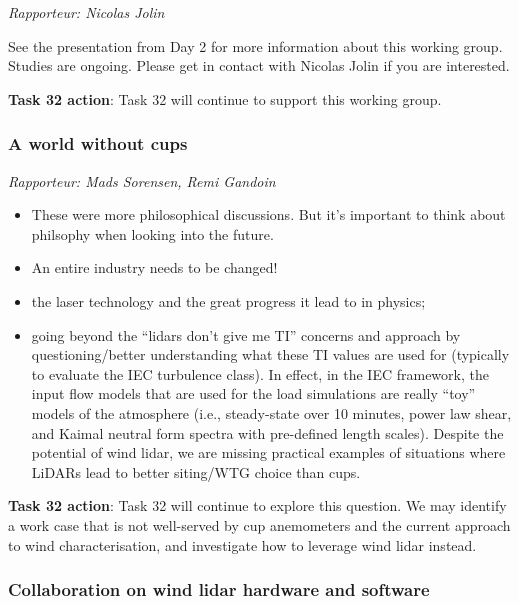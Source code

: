 \emph{Rapporteur: Nicolas Jolin}

See the presentation from Day 2 for more information about this working group. Studies are ongoing. Please get in contact with Nicolas Jolin if you are interested.

\begin{taskactions}
\textbf{Task 32 action}: Task 32 will continue to support this working group.
\end{taskactions}

\subsubsection{A world without cups}

\emph{Rapporteur: Mads Sorensen, Remi Gandoin}

\begin{itemize}
\item These were more philosophical discussions. But it's important to think about philsophy when looking into the future.
\item An entire industry needs to be changed!
\item the laser technology and the great progress it lead to in physics;
\item going beyond the \enquote{lidars don't give me TI} concerns and approach by questioning/better understanding what these TI values are used for (typically to evaluate the IEC turbulence class). In effect, in the IEC framework, the input flow models that are used for the load simulations are really \enquote{toy} models of the atmosphere (i.e., steady-state over 10 minutes, power law shear, and Kaimal neutral form spectra with pre-defined length scales). Despite the potential of wind lidar, we are missing practical examples of situations where LiDARs lead to better siting/WTG choice than cups.
\end{itemize}

\begin{taskactions}
\textbf{Task 32 action}: Task 32 will continue to explore this question. We may identify a work case that is not well-served by cup anemometers and the current approach to wind characterisation, and investigate how to leverage wind lidar instead.
\end{taskactions}

\subsubsection{Collaboration on wind lidar hardware and software}

